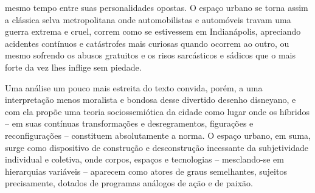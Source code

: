 \begin{multicols}{2}
mesmo tempo entre suas personalidades opostas.\allowbreak{} O espaço urbano se torna assim a clássica selva metropolitana onde automobilistas e automóveis travam uma guerra extrema e cruel,\allowbreak{} correm como se estivessem em Indianápolis,\allowbreak{} apreciando acidentes contínuos e catástrofes mais curiosas quando ocorrem ao outro,\allowbreak{} ou mesmo sofrendo os abusos gratuitos e os risos sarcásticos e sádicos que o mais forte da vez lhes inflige sem piedade.\allowbreak{}\par{}Uma análise um pouco mais estreita do texto convida,\allowbreak{} porém,\allowbreak{} a uma interpretação menos moralista e bondosa desse divertido desenho disneyano,\allowbreak{} e com ela propõe uma teoria sociossemiótica da cidade como lugar onde os híbridos – em suas contínuas transformações e desregramentos,\allowbreak{} figurações e reconfigurações – constituem absolutamente a norma.\allowbreak{} O espaço urbano,\allowbreak{} em suma,\allowbreak{} surge como dispositivo de construção e desconstrução incessante da subjetividade individual e coletiva,\allowbreak{} onde corpos,\allowbreak{} espaços e tecnologias – mesclando-\allowbreak{}se em hierarquias variáveis – aparecem como atores de graus semelhantes,\allowbreak{} sujeitos precisamente,\allowbreak{} dotados de programas análogos de ação e de paixão.\allowbreak{}

\end{multicols}
